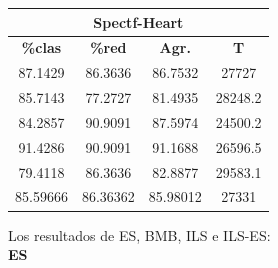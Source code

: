 \documentclass[11pt,a4paper]{article}
\theoremstyle{definition}
\begin{document}
\begin{tabbing}
{		\begin{tabular}{|c|c|c|c|}
			\hline
			\multicolumn{4}{|c|}{\textbf{Spectf-Heart}} \\ \hline
			\textbf{\%clas} & \textbf{\%red} & \textbf{Agr.} & \textbf{T} \\ \hline 
			87.1429 & 86.3636 & 86.7532 & 27727\\ \hline
85.7143 & 77.2727 & 81.4935 & 28248.2\\ \hline
84.2857 & 90.9091 & 87.5974 & 24500.2\\ \hline
91.4286 & 90.9091 & 91.1688 & 26596.5\\ \hline
79.4118 & 86.3636 & 82.8877 & 29583.1\\ \hline
85.59666 & 86.36362 & 85.98012 & 27331\\ \hline
		\end{tabular}
		}
	\end{tabbing}
	
	Los resultados de ES, BMB, ILS e ILS-ES: ~\\
	
	\textbf{ES}
	
\end{document}
